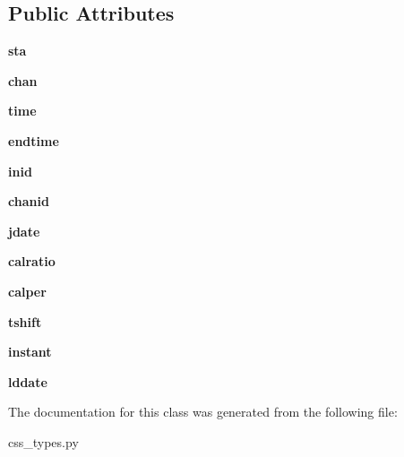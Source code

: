 \subsection*{Public Attributes}
\begin{DoxyCompactItemize}
\item 
\hypertarget{classcss__types_1_1sensor30_a133f6f9fbb77cdb460bc903c3ca804ff}{}{\bfseries sta}\label{classcss__types_1_1sensor30_a133f6f9fbb77cdb460bc903c3ca804ff}

\item 
\hypertarget{classcss__types_1_1sensor30_ace220f59e231d317afbf06afdda1884e}{}{\bfseries chan}\label{classcss__types_1_1sensor30_ace220f59e231d317afbf06afdda1884e}

\item 
\hypertarget{classcss__types_1_1sensor30_affd9e25e47b8bec9a922978ae2b302b3}{}{\bfseries time}\label{classcss__types_1_1sensor30_affd9e25e47b8bec9a922978ae2b302b3}

\item 
\hypertarget{classcss__types_1_1sensor30_ab29cdb8365b519207615bd9bae6a7811}{}{\bfseries endtime}\label{classcss__types_1_1sensor30_ab29cdb8365b519207615bd9bae6a7811}

\item 
\hypertarget{classcss__types_1_1sensor30_a2fbf2d41fddf701b893e0f78e4790351}{}{\bfseries inid}\label{classcss__types_1_1sensor30_a2fbf2d41fddf701b893e0f78e4790351}

\item 
\hypertarget{classcss__types_1_1sensor30_a87a3f8d245177fcaec508eb2371e5d23}{}{\bfseries chanid}\label{classcss__types_1_1sensor30_a87a3f8d245177fcaec508eb2371e5d23}

\item 
\hypertarget{classcss__types_1_1sensor30_ad350cfdaeebc67f164baaf9b9f032fb2}{}{\bfseries jdate}\label{classcss__types_1_1sensor30_ad350cfdaeebc67f164baaf9b9f032fb2}

\item 
\hypertarget{classcss__types_1_1sensor30_a473ba3d749b80796f88099ce1203959d}{}{\bfseries calratio}\label{classcss__types_1_1sensor30_a473ba3d749b80796f88099ce1203959d}

\item 
\hypertarget{classcss__types_1_1sensor30_af13275e02b52cf2dc7d100ca3ef6fd00}{}{\bfseries calper}\label{classcss__types_1_1sensor30_af13275e02b52cf2dc7d100ca3ef6fd00}

\item 
\hypertarget{classcss__types_1_1sensor30_a3480d9f12f6db07050a3b82bcaea392c}{}{\bfseries tshift}\label{classcss__types_1_1sensor30_a3480d9f12f6db07050a3b82bcaea392c}

\item 
\hypertarget{classcss__types_1_1sensor30_a2aada05d6a77aeedb0ad271452b2b4a7}{}{\bfseries instant}\label{classcss__types_1_1sensor30_a2aada05d6a77aeedb0ad271452b2b4a7}

\item 
\hypertarget{classcss__types_1_1sensor30_aeac73e1876b3e009d7e67c3e3951ffaa}{}{\bfseries lddate}\label{classcss__types_1_1sensor30_aeac73e1876b3e009d7e67c3e3951ffaa}

\end{DoxyCompactItemize}


The documentation for this class was generated from the following file\+:\begin{DoxyCompactItemize}
\item 
css\+\_\+types.\+py\end{DoxyCompactItemize}
